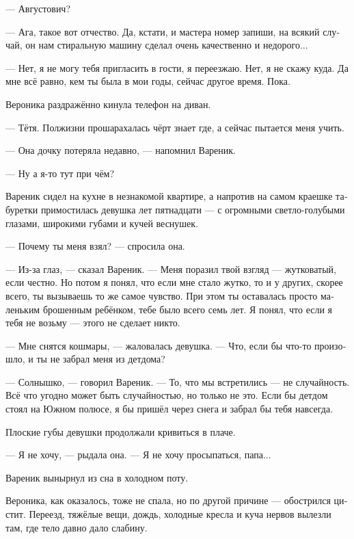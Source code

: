 \documentclass[a5paper,12pt,fleqn]{extbook}\usepackage{cooltooltips}\usepackage{polyglossia}\setdefaultlanguage[babelshorthands=true]{russian}\setotherlanguage{english}\defaultfontfeatures{Ligatures=TeX,Mapping=tex-text} \usepackage{xcolor}\definecolor{lightgray}{HTML}{bbbbbb}\color{lightgray}\newcommand{\ml}[3]{\textenglish{\textcolor{black}{#3}}}
\newcommand{\asterism}{\vspace{1em}{\centering\Large\bfseries$\ast~\ast~\ast$\par}\vspace{1em}}
\newcommand{\textspace}{\vspace{1em}{\centering\Large\bfseries<...>\par}\vspace{1em}}
\begin{document}
--- Августович?

--- Ага, такое вот отчество.
Да, кстати, и мастера номер запиши, на всякий случай, он нам стиральную машину сделал очень качественно и недорого...

\asterism

\textspace

--- Нет, я не могу тебя пригласить в гости, я переезжаю.
Нет, я не скажу куда.
Да мне всё равно, кем ты была в мои годы, сейчас другое время.
Пока.

Вероника раздражённо кинула телефон на диван.

--- Тётя.
Полжизни прошарахалась чёрт знает где, а сейчас пытается меня учить.

--- Она дочку потеряла недавно, --- напомнил Вареник.

--- Ну а я-то тут при чём?

\textspace

\asterism

\textspace

Вареник сидел на кухне в незнакомой квартире, а напротив на самом краешке табуретки примостилась девушка лет пятнадцати --- с огромными светло-голубыми глазами, широкими губами и кучей веснушек.

--- Почему ты меня взял? --- спросила она.

--- Из-за глаз, --- сказал Вареник.
--- Меня поразил твой взгляд --- жутковатый, если честно.
Но потом я понял, что если мне стало жутко, то и у других, скорее всего, ты вызываешь то же самое чувство.
При этом ты оставалась просто маленьким брошенным ребёнком, тебе было всего семь лет.
Я понял, что если я тебя не возьму --- этого не сделает никто.

--- Мне снятся кошмары, --- жаловалась девушка.
--- Что, если бы что-то произошло, и ты не забрал меня из детдома?

--- Солнышко, --- говорил Вареник.
--- То, что мы встретились --- не случайность.
Всё что угодно может быть случайностью, но только не это.
Если бы детдом стоял на Южном полюсе, я бы пришёл через снега и забрал бы тебя навсегда.

Плоские губы девушки продолжали кривиться в плаче.

--- Я не хочу, --- рыдала она.
--- Я не хочу просыпаться, папа...

Вареник вынырнул из сна в холодном поту.

Вероника, как оказалось, тоже не спала, но по другой причине --- обострился цистит.
Переезд, тяжёлые вещи, дождь, холодные кресла и куча нервов вылезли там, где тело давно дало слабину.
\end{document}
